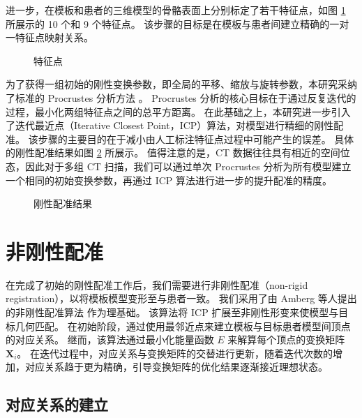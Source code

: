 进一步，在模板和患者的三维模型的骨骼表面上分别标定了若干特征点，如图 \ref{fig:landmarks} 所展示的 10 个和 9 个特征点。
该步骤的目标是在模板与患者间建立精确的一对一特征点映射关系。

\begin{figure}
  \centering
  \caption{特征点}
  \label{fig:landmarks}
\end{figure}

为了获得一组初始的刚性变换参数，即全局的平移、缩放与旋转参数，本研究采纳了标准的 Procrustes 分析方法 \cite{rossProcrustesAnalysis2004}。
Procrustes 分析的核心目标在于通过反复迭代的过程，最小化两组特征点之间的总平方距离。
在此基础之上，本研究进一步引入了迭代最近点（Iterative Closest Point，ICP）算法，对模型进行精细的刚性配准。
该步骤的主要目的在于减小由人工标注特征点过程中可能产生的误差。
具体的刚性配准结果如图 \ref{fig:align} 所展示。
值得注意的是，CT 数据往往具有相近的空间位态，因此对于多组 CT 扫描，我们可以通过单次 Procrustes 分析为所有模型建立一个相同的初始变换参数，再通过 ICP 算法进行进一步的提升配准的精度。

\begin{figure}
  \centering
  \caption{刚性配准结果}
  \label{fig:align}
\end{figure}

\section{非刚性配准}

在完成了初始的刚性配准工作后，我们需要进行非刚性配准（non-rigid registration），以将模板模型变形至与患者一致。
我们采用了由 Amberg 等人提出的非刚性配准算法 \cite{ambergOptimalStepNonrigid2007} 作为理基础。
该算法将 ICP 扩展至非刚性形变来使模型与目标几何匹配。
在初始阶段，通过使用最邻近点来建立模板与目标患者模型间顶点的对应关系。
继而，该算法通过最小化能量函数 $E$ 来解算每个顶点的变换矩阵 $\bm{X}_i$。
在迭代过程中，对应关系与变换矩阵的交替进行更新，随着迭代次数的增加，对应关系趋于更为精确，引导变换矩阵的优化结果逐渐接近理想状态。

\subsection{对应关系的建立}

